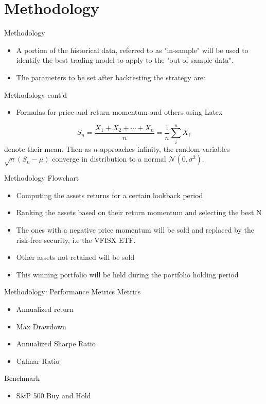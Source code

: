 \documentclass{beamer}
\begin{document}
\section{Methodology}
\begin{frame}{Methodology}
	\begin{itemize}
		\item A portion of the historical data, referred to as "in-sample" will be used to identify the best trading model to apply to the "out of sample data". 
		\item The parameters to be set after backtesting the strategy are: 
	\end{itemize}
\end{frame}

\begin{frame}{Methodology cont'd}
	\begin{itemize}
		\item Formulas for price and return momentum and others using Latex 
	\end{itemize}
	
	$$S_n = \frac{X_1 + X_2 + \cdots + X_n}{n}
	= \frac{1}{n}\sum_{i}^{n} X_i$$
	denote their mean. Then as $n$ approaches infinity, the random variables $\sqrt{n}(S_n - \mu)$ converge in distribution to a normal $\mathcal{N}(0, \sigma^2)$.
	
\end{frame}

\begin{frame}{Methodology}
	Flowchart
	\begin{itemize}
		\item Computing the assets returns for a certain lookback period
		\item Ranking the assets based on their return momentum and selecting the
		best N
		\item The ones with a negative price momentum will be sold and replaced
		by the risk-free security, i.e the VFISX ETF.
		\item Other assets not retained will be sold
		\item  This winning portfolio will be held during the portfolio holding period
	\end{itemize}
\end{frame}

\begin{frame}{Methodology: Performance Metrics}
	Metrics
	\begin{itemize}
		\item Annualized return
		\item Max Drawdown
		\item Annualized Sharpe Ratio
		\item Calmar Ratio
	\end{itemize}
	Benchmark
	\begin{itemize}
		\item S\&P 500 Buy and Hold
	\end{itemize}
\end{frame}
\end{document}
